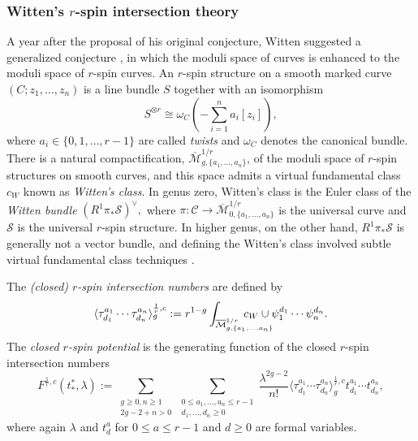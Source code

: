 \documentclass[11pt]{amsart}
\theoremstyle{definition}
\theoremstyle{remark}
\newcommand{\M}{\ensuremath{\overline{\mathcal{M}}}}
\newcommand{\<}{\left<}
\renewcommand{\>}{\right>}
\numberwithin{equation}{section}
\def\Mbar{{\overline{\mathcal M}}}
\begin{document}
\subsubsection{Witten's $r$-spin intersection theory}
A year after the proposal of his original conjecture, Witten suggested a generalized conjecture \cite{Witten93}, in which the moduli space of curves is enhanced to the moduli space of $r$-spin curves.  An $r$-spin structure on a smooth marked curve $(C;z_1, \ldots, z_n)$ is a line bundle $S$ together with an isomorphism
\[S^{\otimes r} \cong \omega_{C}\left(-\sum_{i=1}^n a_i[z_i]\right),\]
where $a_i \in \{0,1,\ldots, r-1\}$ are called \emph{twists} and $\omega_C$ denotes the canonical bundle.  There is a %
natural compactification, $\Mbar_{g,\{a_1, \ldots, a_n\}}^{1/r}$, of the %
moduli space of $r$-spin structures on smooth curves, and this space admits a virtual fundamental class $c_W$ known as \emph{Witten's class}. In genus zero, Witten's class is the Euler class of the \emph{Witten bundle} $(R^1\pi_*\mathcal{S})^{\vee},$ where $\pi: \mathcal{C} \rightarrow \Mbar_{0,\{a_1, \ldots, a_n\}}^{1/r}$ is the %
universal curve and $\mathcal{S}$ %
is the universal $r$-spin structure.  In higher genus, on the other hand, $R^1\pi_*\mathcal{S}$ is generally not a vector bundle, and defining the Witten's class involved subtle virtual fundamental class %
techniques \cite{PV,ChiodoWitten,Moc06,FJR,CLL}.

The %
{\it (closed) $r$-spin intersection numbers} are defined by
\begin{gather}\label{eq:closed r-spin}
\langle\tau^{a_1}_{d_1}\cdots\tau^{a_n}_{d_n}\rangle^{\frac{1}{r},c}_g:=r^{1-g}\int_{\M^{1/r}_{g,\{a_1, \ldots, a_n\}}} \hspace{-1cm} c_W \cup \psi_1^{d_1} \cdots \psi_n^{d_n}.
\end{gather}
The \emph{closed $r$-spin potential}
is the generating function of the closed $r$-spin intersection numbers\[
F^{\frac{1}{r},c}(t^*_*,\lambda):=\sum_{\substack{g \geq 0, n \geq 1\\2g-2+n>0}} \sum_{\substack{0 \leq a_1, \ldots, a_n \leq r-1\\ d_1, \ldots, d_n \geq 0}} \frac{\lambda^{2g-2}}{n!}\langle\tau^{a_1}_{d_1}\cdots\tau^{a_n}_{d_n}\rangle^{\frac{1}{r},c}_g t^{a_1}_{d_1} \cdots t^{a_n}_{d_n},
\]
where again $\lambda$ and $t^a_d$  for $0\le a\le r-1$ and $d\ge 0$ are formal variables. 
\end{document}
